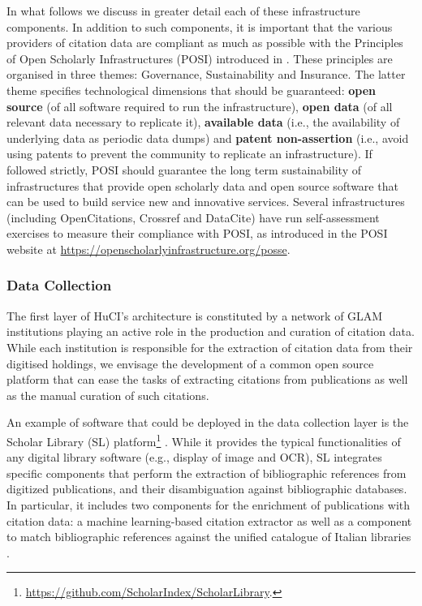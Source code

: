 In what follows we discuss in greater detail each of these infrastructure components. In addition to such components, it is important that the various providers of citation data are compliant as much as possible with the Principles of Open Scholarly Infrastructures (POSI) introduced in \cite{bilder_principles_2015}. These principles are organised in three themes: Governance, Sustainability and Insurance. The latter theme specifies technological dimensions that should be guaranteed: \textbf{open source} (of all software required to run the infrastructure), \textbf{open data} (of all relevant data necessary to replicate it), \textbf{available data} (i.e., the availability of underlying data as periodic data dumps) and \textbf{patent non-assertion} (i.e., avoid using patents to prevent the community to replicate an infrastructure). If followed strictly, POSI should guarantee the long term sustainability of infrastructures that provide open scholarly data and open source software that can be used to build service new and innovative services. Several infrastructures (including OpenCitations, Crossref and DataCite) have run self-assessment exercises to measure their compliance with POSI, as introduced in the POSI website at \url{https://openscholarlyinfrastructure.org/posse}.

\subsubsection{Data Collection}

The first layer of HuCI's architecture is constituted by a network of GLAM institutions playing an active role in the production and curation of citation data. While each institution is responsible for the extraction of citation data from their digitised holdings, we envisage the development of a common open source platform that can ease the tasks of extracting citations from publications as well as the manual curation of such citations. 

An example of software that could be deployed in the data collection layer is the Scholar Library (SL) platform\footnote{\url{https://github.com/ScholarIndex/ScholarLibrary}.} \cite{colavizza_linked_2018}. While it provides the typical functionalities of any digital library software (e.g., display of image and OCR), SL integrates specific components that perform the extraction of bibliographic references from digitized publications, and their disambiguation against bibliographic databases. In particular, it includes two components for the enrichment of publications with citation data: a machine learning-based citation extractor as well as a component to match bibliographic references against the unified catalogue of Italian libraries \cite{colavizza_references_2018}. 

